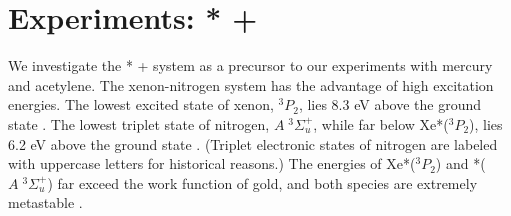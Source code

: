 \documentclass[12pt]{mitthesis}
\begin{document}



\section{Experiments: * + }

We investigate the * +  system as a precursor to our
experiments with mercury and acetylene.  The xenon-nitrogen system has
the advantage of high excitation energies.  The lowest excited state
of xenon, $^3P_2$, lies 8.3 eV above the ground state
\cite{saloman04}.  The lowest triplet state of nitrogen, $A \;
^3\Sigma_u^+$, while far below Xe*($^3P_2$), lies 6.2 eV above the
ground state \cite{lofthus77}.  (Triplet electronic states of nitrogen
are labeled with uppercase letters for historical reasons.)  The
energies of Xe*($^3P_2$) and *($A \; ^3\Sigma_u^+$) far exceed
the work function of gold, and both species are extremely metastable
\cite{mishra01, lofthus77}.
\end{document}

